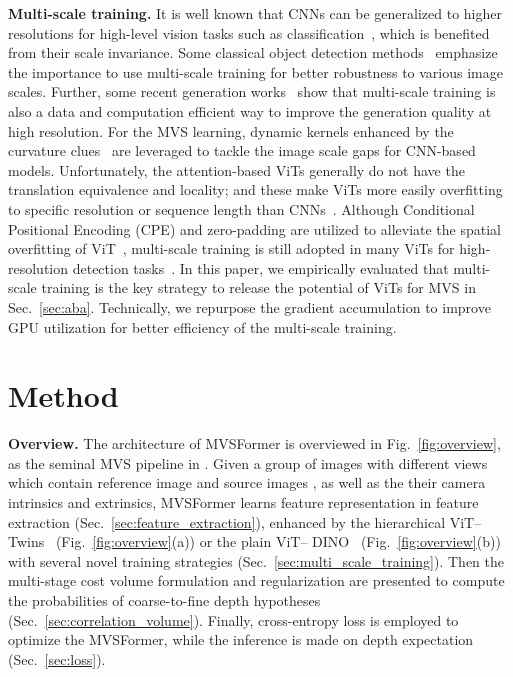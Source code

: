 \documentclass[10pt]{article} \usepackage[preprint]{tmlr}
\begin{document}
\noindent\textbf{Multi-scale training.}
It is well known that CNNs can be generalized to higher resolutions for high-level vision tasks such as classification~\citep{chu2021conditional}, which is benefited from their scale invariance. 
Some classical object detection methods~\citep{cai2016unified,redmon2017yolo9000} emphasize the importance to use multi-scale training for better robustness to various image scales.
Further, some recent generation works~\citep{dong2022incremental,chai2022any,cao2022learning} show that multi-scale training is also a data and computation efficient way to improve the generation quality at high resolution.
For the MVS learning, dynamic kernels enhanced by the curvature clues~\citep{giang2021curvature} are leveraged to tackle the image scale gaps for CNN-based models.
Unfortunately, the attention-based ViTs generally do not have the translation equivalence and locality; and these make ViTs more easily overfitting to specific resolution or sequence length than CNNs~\citep{d2021convit,dosovitskiy2020image,xu2021vitae}. Although Conditional Positional Encoding (CPE) and zero-padding are utilized to alleviate the spatial overfitting of ViT~\citep{chu2021conditional}, multi-scale training is still adopted in many ViTs for high-resolution detection tasks~\citep{liu2021swin,chu2021twins,carion2020end}. 
In this paper, we empirically evaluated that multi-scale training is the key strategy to release the potential of ViTs for MVS in Sec.~\ref{sec:aba}. Technically, we repurpose the gradient accumulation to improve GPU utilization for better efficiency of the multi-scale training.


\section{Method}

\noindent\textbf{Overview.}
The architecture of MVSFormer is overviewed in Fig.~\ref{fig:overview}, as the seminal MVS pipeline in \citet{yao2018mvsnet}. 
Given a group of  images with different views which contain reference image  and source images , as well as the their camera intrinsics and extrinsics, MVSFormer  learns  feature representation in feature extraction (Sec.~\ref{sec:feature_extraction}), enhanced by the hierarchical ViT-- Twins~\citep{chu2021twins} (Fig.~\ref{fig:overview}(a)) or the plain ViT-- DINO~\citep{caron2021emerging} (Fig.~\ref{fig:overview}(b)) with several novel training strategies (Sec.~\ref{sec:multi_scale_training}). Then the multi-stage cost volume formulation and regularization are presented to compute the probabilities of coarse-to-fine depth hypotheses (Sec.~\ref{sec:correlation_volume}).
Finally, cross-entropy loss is employed to optimize the MVSFormer, while the inference is made on depth expectation (Sec.~\ref{sec:loss}).
\end{document}
